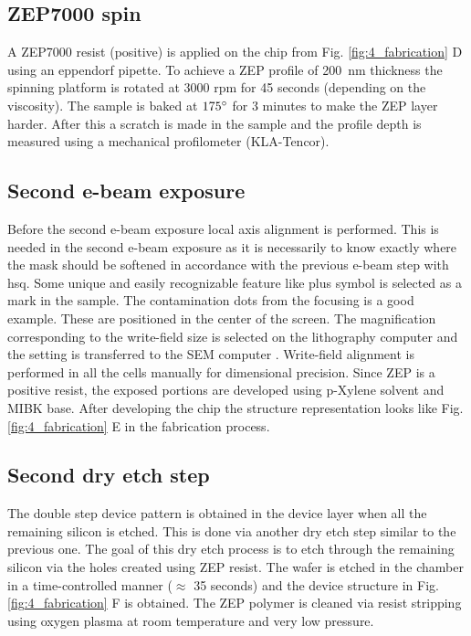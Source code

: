 \documentclass[../report.tex]{subfiles}
\begin{document}
\subsection{ZEP7000 spin}
A ZEP7000 resist (positive) is applied on the chip from Fig. \ref{fig:4_fabrication} D using an eppendorf pipette. To achieve a ZEP profile of \SI{200}{\nano \meter} thickness the spinning platform is rotated at 3000 rpm for 45 seconds (depending on the viscosity). The sample is baked at $\mathrm{175^{\circ}}$ for 3 minutes to make the ZEP layer harder. After this a scratch is made in the sample and the profile depth is measured using a mechanical profilometer (KLA-Tencor).

\subsection{Second e-beam exposure}
Before the second e-beam exposure local axis alignment is performed. This is needed in the second e-beam exposure as it is necessarily to know exactly where the mask should be softened in accordance with the previous e-beam step with \gls{hsq}. Some unique and easily recognizable feature like plus symbol is selected as a mark in the sample. The contamination dots from the focusing is a good example. These are positioned in the center of the screen. The magnification corresponding to the write-field size is selected on the lithography computer and the setting is transferred to the SEM computer \cite{write_field}. Write-field alignment is performed in all the cells manually for dimensional precision. Since ZEP is a positive resist, the exposed portions are developed using p-Xylene solvent and MIBK base. After developing the chip the structure representation looks like Fig. \ref{fig:4_fabrication} E in the fabrication process.

\subsection{Second dry etch step}
The double step device pattern is obtained in the device layer when all the remaining silicon is etched. This is done via another dry etch step similar to the previous one. The goal of this dry etch process is to etch through the remaining silicon via the holes created using ZEP resist. The wafer is etched in the chamber in a time-controlled manner ($\approx$ 35 seconds) and the device structure in Fig. \ref{fig:4_fabrication} F is obtained. The ZEP polymer is cleaned via resist stripping using oxygen plasma at room temperature and very low pressure. 
\end{document}
